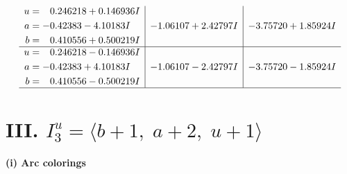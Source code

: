 \documentclass[1p]{elsarticle_modified}
\theoremstyle{definition}
\begin{document}
$$\begin{array}{c|c|c}
\begin{aligned}
u &= \phantom{-}0.246218 + 0.146936 I \\
a &= -0.42383 - 4.10183 I \\
b &= \phantom{-}0.410556 + 0.500219 I\end{aligned}
 & -1.06107 + 2.42797 I & -3.75720 + 1.85924 I \\ \hline\begin{aligned}
u &= \phantom{-}0.246218 - 0.146936 I \\
a &= -0.42383 + 4.10183 I \\
b &= \phantom{-}0.410556 - 0.500219 I\end{aligned}
 & -1.06107 - 2.42797 I & -3.75720 - 1.85924 I\\
 \hline 
 \end{array}$$\newpage\newpage\renewcommand{\arraystretch}{1}
\centering \section*{III. $I^u_{3}= \langle b+1,\;a+2,\;u+1 \rangle$}
\flushleft \textbf{(i) Arc colorings}\\
\end{document}
